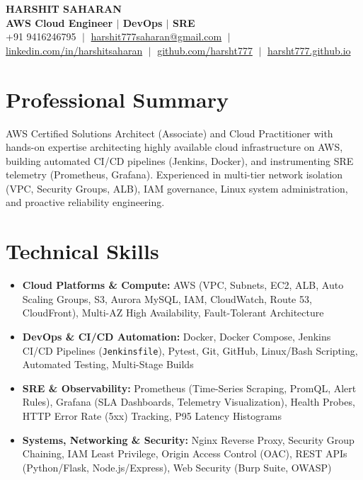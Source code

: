 \documentclass[letterpaper,9.8pt]{article}
\newcommand{\resumeSkillListStart}{\begin{itemize}[leftmargin=0.18in, labelsep=0.06in, itemsep=1.2pt, topsep=0.5pt, parsep=0pt, partopsep=0pt]}
\newcommand{\resumeSkillListEnd}{\end{itemize}\vspace{1.5pt}}
\begin{document}
\begin{center}
    {\Huge \textbf{HARSHIT SAHARAN}} \\ \vspace{2pt}
    {\large \textbf{\color{primary}AWS Cloud Engineer $\vert$ DevOps $\vert$ SRE}} \\ \vspace{3.5pt}
    \small 
    +91 9416246795 $\;\vert\;$ 
    \href{mailto:harshit777saharan@gmail.com}{harshit777saharan@gmail.com} $\;\vert\;$ 
    \href{https://linkedin.com/in/harshitsaharan}{linkedin.com/in/harshitsaharan} $\;\vert\;$ 
    \href{https://github.com/harsht777}{github.com/harsht777} $\;\vert\;$ 
    \href{https://harsht777.github.io/}{harsht777.github.io}
\end{center}
\vspace{-10pt}

\section{Professional Summary}
\vspace{1pt}
\small{
AWS Certified Solutions Architect (Associate) and Cloud Practitioner with hands-on expertise architecting highly available cloud infrastructure on AWS, building automated CI/CD pipelines (Jenkins, Docker), and instrumenting SRE telemetry (Prometheus, Grafana). Experienced in multi-tier network isolation (VPC, Security Groups, ALB), IAM governance, Linux system administration, and proactive reliability engineering.
}
\vspace{2pt}

\section{Technical Skills}
\resumeSkillListStart
  \item \small{\textbf{Cloud Platforms \& Compute:} AWS (VPC, Subnets, EC2, ALB, Auto Scaling Groups, S3, Aurora MySQL, IAM, CloudWatch, Route 53, CloudFront), Multi-AZ High Availability, Fault-Tolerant Architecture}
  \item \small{\textbf{DevOps \& CI/CD Automation:} Docker, Docker Compose, Jenkins CI/CD Pipelines (\texttt{Jenkinsfile}), Pytest, Git, GitHub, Linux/Bash Scripting, Automated Testing, Multi-Stage Builds}
  \item \small{\textbf{SRE \& Observability:} Prometheus (Time-Series Scraping, PromQL, Alert Rules), Grafana (SLA Dashboards, Telemetry Visualization), Health Probes, HTTP Error Rate (5xx) Tracking, P95 Latency Histograms}
  \item \small{\textbf{Systems, Networking \& Security:} Nginx Reverse Proxy, Security Group Chaining, IAM Least Privilege, Origin Access Control (OAC), REST APIs (Python/Flask, Node.js/Express), Web Security (Burp Suite, OWASP)}
\resumeSkillListEnd
\end{document}
